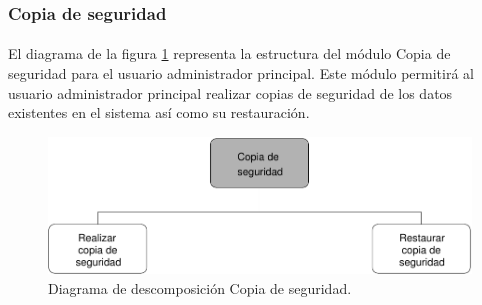 \subsubsection{Copia de seguridad}

  \paragraph{}El diagrama de la figura
  \ref{diagramaDescomposicionCopiaSeguridad} representa la estructura del
  módulo Copia de seguridad para el usuario administrador principal.
  Este módulo permitirá al usuario administrador principal realizar copias de
  seguridad de los datos existentes en el sistema así como su restauración.

  \begin{figure}[!ht]
    \begin{center}
      \includegraphics[]{11.Disenyo_Arquitectonico/11.2.Diagramas_Descomposicion/11.2.2.Modulo_administrador_principal/CopiaSeguridad/Diagramas/copia_seguridad.pdf}
      \caption{Diagrama de descomposición Copia de seguridad.}
      \label{diagramaDescomposicionCopiaSeguridad}
    \end{center}
  \end{figure}
